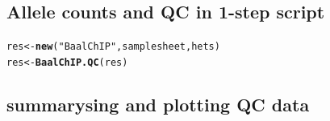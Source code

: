 \documentclass{article}\usepackage[]{graphicx}\usepackage[usenames,dvipsnames]{color}
\makeatletter
\newcommand{\hlstr}[1]{\textcolor[rgb]{0.192,0.494,0.8}{#1}}%
\newcommand{\hlstd}[1]{\textcolor[rgb]{0.345,0.345,0.345}{#1}}%
\newcommand{\hlkwb}[1]{\textcolor[rgb]{0.69,0.353,0.396}{#1}}%
\newcommand{\hlkwd}[1]{\textcolor[rgb]{0.737,0.353,0.396}{\textbf{#1}}}%
\newenvironment{kframe}{%
 \def\at@end@of@kframe{}%
 \ifinner\ifhmode%
  \def\at@end@of@kframe{\end{minipage}}%
  \begin{minipage}{\columnwidth}%
 \fi\fi%
 \def\FrameCommand##1{\hskip\@totalleftmargin \hskip-\fboxsep
 \colorbox{shadecolor}{##1}\hskip-\fboxsep
     \hskip-\linewidth \hskip-\@totalleftmargin \hskip\columnwidth}%
 \MakeFramed {\advance\hsize-\width
   \@totalleftmargin\z@ \linewidth\hsize
   \@setminipage}}%
 {\par\unskip\endMakeFramed%
 \at@end@of@kframe}
\newenvironment{knitrout}{}{} %
\makeatother
\begin{document}
\subsection{Allele counts and QC in 1-step script}

\begin{knitrout}
\color{fgcolor}\begin{kframe}
\begin{alltt}
\hlstd{res} \hlkwb{<-} \hlkwd{new}\hlstd{(}\hlstr{"BaalChIP"}\hlstd{, samplesheet, hets)}
\hlstd{res} \hlkwb{<-} \hlkwd{BaalChIP.QC}\hlstd{(res)}
\end{alltt}
\end{kframe}
\end{knitrout}

\subsection{summarysing and plotting QC data}
\end{document}
